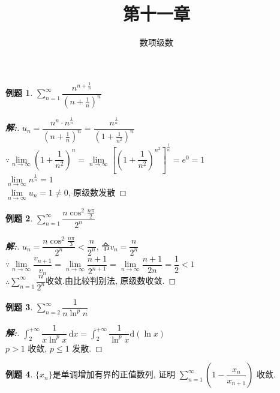 \documentclass[12pt,a4paper]{ctexart}
\title{第十一章}
\author{数项级数}
\newcommand{\dx}{\,\mathrm{d}x}
\newenvironment{solution}{\begin{proof}[\hspace{2em}\textbf{解:}]}{\end{proof}}
\theoremstyle{definition}%
\newtheorem{exercise}{\hspace{2em}例题}
\begin{document}
\maketitle
\newpage
\begin{exercise}
	$\displaystyle
	\sum\limits_{n=1}^{\infty}\dfrac{n^{n+\frac{1}{n}}}{(n+\frac{1}{n})^n}$
\end{exercise}
\begin{solution}
	$\displaystyle u_n
	=\dfrac{n^n \cdot n^{\frac{1}{n}}}{(n+\frac{1}{n})^n}
	=\dfrac{n^{\frac{1}{n}}}{(1+\frac{1}{n^2})^n}$\\
	
	$ \because \lim\limits_{n \to \infty}(1+\dfrac{1}{n^2})^n
	=\lim\limits_{n \to \infty}[(1+\dfrac{1}{n^2})^{n^2}]^{\frac{1}{n}}
	=e^0=1 $\\
	
	$ \lim\limits_{n \to \infty}n^{\frac{1}{n}}=1 $\\
	
	$ \lim\limits_{n \to \infty}u_n=1 \ne 0 $, 原级数发散
\end{solution}
\begin{exercise}
	$ \displaystyle
	\sum_{n=1}^{\infty}\dfrac{n\cos^2\frac{n\pi}{2}}{2^n} $
\end{exercise}
\begin{solution}
	$ u_n=\dfrac{n\cos^2\frac{n\pi}{3}}{2^n}<\dfrac{n}{2^n} $, 令$ v_n=\dfrac{n}{2^n} $\\
	
	$ \because \lim\limits_{n \to \infty}\dfrac{v_{n+1}}{v_n}
	=\lim\limits_{n \to \infty}\dfrac{n+1}{2^{n+1}}
	=\lim\limits_{n \to \infty}\dfrac{n+1}{2n}
	=\dfrac{1}{2}<1 $\\
	
	$ \therefore\displaystyle\sum_{n=1}^{\infty}\dfrac{n}{2^n} $收敛.由比较判别法, 原级数收敛.
\end{solution}
\begin{exercise}
	$ \displaystyle
	\sum_{n=2}^{\infty}\dfrac{1}{n \ln^p n} $
\end{exercise}
\begin{solution}
	$ \displaystyle\int_{2}^{+\infty} \dfrac{1}{x \ln^p x}\dx
	=\int_{2}^{+\infty}\dfrac{1}{\ln^p x} \mathrm{d}(\ln x) $\\
	
	$ p>1 $ 收敛, $ p \le 1 $ 发散.
\end{solution}
\begin{exercise}
	$\{x_n\}$是单调增加有界的正值数列, 证明 $\displaystyle\sum_{n=1}^{\infty}(1-\dfrac{x_n}{x_{n+1}})$ 收敛.
\end{exercise}
\end{document}
